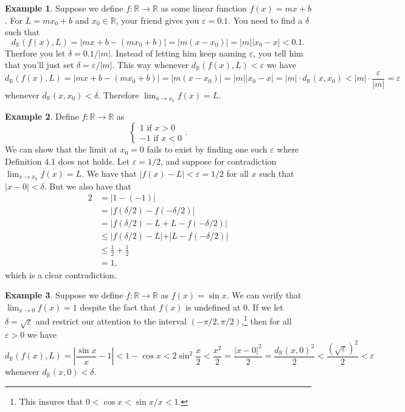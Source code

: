 \documentclass{article}
\newcommand{\R}{\mathbb{R}}
\theoremstyle{definition}
\newtheorem{example}{Example}[section]
\begin{document}
	\begin{example}
		Suppose we define $ f:\R\to\R $ as some linear function $ f(x)=mx+b $. For $ L=mx_0+b $ and $ x_0\in\R $, your friend gives you $ \varepsilon=0.1 $. You need to find a $ \delta $ such that $$d_\R(f(x),L)=|mx+b-(mx_0+b)|=|m(x-x_0)|=|m||x_0-x|<0.1.$$ Therfore you let $ \delta=0.1/|m| $. Instead of letting him keep naming $ \varepsilon $, you tell him that you'll just set $ \delta=\varepsilon/|m| $. This way whenever $ d_\R(f(x),L)<\varepsilon $ we have 
		$$ d_\R(f(x),L)=|mx+b-(mx_0+b)|=|m(x-x_0)|=|m||x_0-x|=|m|\cdot d_\R(x,x_0)<|m|\cdot\frac{\varepsilon}{|m|}=\varepsilon $$ whenever $ d_\R(x,x_0)<\delta $. Therefore $ \lim_{x\to x_0}f(x)=L $.  
	\end{example}
	\begin{example}
		Define $ f:\R\to\R $ as 
		$$ \begin{cases}
			1\text{ if }x>0\\-1\text{ if }x<0
		\end{cases} .$$
		We can show that the limit at $ x_0=0 $ fails to exist by finding one such $ \varepsilon $ where Definition 4.1 does not holds. Let $ \varepsilon=1/2 $, and suppose for contradiction $ \lim_{x\to x_0}f(x)=L $. We have that $ |f(x)-L|<\varepsilon=1/2 $ for all $ x $ such that $ |x-0|<\delta $. But we also have that 
		\begin{align*}
			2&=|1-(-1)|\\
			&=\left\lvert f(\delta/2)-f(-\delta/2) \right\rvert\\
			&=\left\lvert f(\delta/2)-L+L-f(-\delta/2) \right\rvert\\
			&\le\left\lvert f(\delta/2)-L|+|L-f(-\delta/2) \right\rvert\\
			&\le\frac{1}{2}+\frac{1}{2}\\&=1,
		\end{align*}
		which is a clear contradiction.
	\end{example}
	\begin{example}
		Suppose we define $ f:\R\to\R $ as $ f(x)=\sin x $. We can verify that $ \lim_{x\to 0}f(x)=1 $ despite the fact that $ f(x) $ is undefined at $ 0 $. If we let $ \delta=\sqrt{\varepsilon} $ and restrict our attention to the interval $ (-\pi/2,\pi/2) $,\footnote{This insures that $ 0<\cos x<\sin x/x <1 $.} then for all $ \varepsilon>0 $ we have $$d_\R(f(x),L)=\left\lvert \frac{\sin x}{x}-1\right\rvert<1-\cos x<2\sin^2\frac{x}{2}<\frac{x^2}{2}=\frac{|x-0|^2}{2}=\frac{d_\R(x,0)^2}{2}<\frac{(\sqrt{\varepsilon})^2}{2}<\varepsilon$$ whenever $ d_\R(x,0)<\delta $. 
	\end{example}
\end{document}
